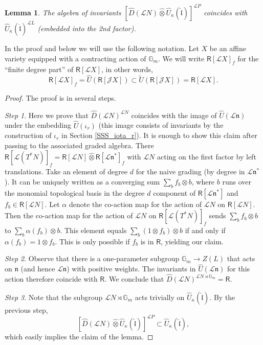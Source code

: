 \documentclass{amsart}
\newtheorem{Lem}[Thm]{Lemma}
\theoremstyle{definition}
\newcommand{\Ring}{\mathsf{R}}
\newcommand{\lf}{\mathfrak{l}}
\newcommand{\Jet}{\mathscr{J}}
\newcommand{\Loop}{\mathscr{L}}
\numberwithin{equation}{section}
\begin{document}
\begin{Lem}\label{Lem:invariant_containment}
The algebra of invariants
$[\widehat{D}(\Loop N)\widehat{\otimes}\widehat{U}_\kappa(\hat{\lf})]^{\Loop P}$ coincides with $\widehat{U}_\kappa(\hat{\lf})^{\Loop L}$ (embedded into the 2nd factor).
\end{Lem}

 In the proof and below we will use the following notation. Let $X$ be an affine variety equipped with a contracting action of $\mathbb{G}_m$. We will write $\Ring[\Loop X]_f$ for the ``finite degree part'' of $\Ring[\Loop X]$, in other words, $$\Ring[\Loop X]_f=\widehat{U}(\Ring[\Jet X])\subset \widetilde{U}(\Ring[\Jet X])=\Ring[\Loop X].$$

\begin{proof}
The proof is in several steps. 

{\it Step 1}. Here we prove that $\widehat{D}(\Loop N)^{\Loop N}$ coincides with the image of $\widehat{U}(\Loop \mathfrak{n})$ under the embedding  $\widehat{U}(\iota_r)$ (this image consists of invariants by the construction of $\iota_r$ in Section \ref{SSS_iota_r}). It is enough to show this claim 
after passing to the associated graded algebra. There 
$\Ring[\Loop(T^*N)]_f=\Ring[\Loop N]\widehat{\otimes}\Ring[\Loop \mathfrak{n}^*]_f$ with $\Loop N$ acting on the first factor by left translations. Take an element of degree $d$ for the naive grading
(by degree in $\Loop \mathfrak{n}^*$). It can be uniquely written as a converging sum $\sum_b f_b\otimes b$, where $b$ runs over the monomial topological basis in the degree $d$ component of  $\Ring[\Loop \mathfrak{n}^*]$ and $f_b\in \Ring[\Loop N]$. 
Let $\alpha$ denote the co-action map for the action of $\Loop N$ on $\Ring[\Loop N]$. Then the co-action map for the action of $\Loop N$
on $\Ring[\Loop(T^*N)]_f$ sends $\sum_b f_b\otimes b$ to 
$\sum_b \alpha(f_b)\otimes b$. This element equals
$\sum_b (1\otimes f_b)\otimes b$ if and only if $\alpha(f_b)=1\otimes f_b$. This is only possible if $f_b$ is in $\Ring$, yielding our claim. 

{\it Step 2}. Observe that there is a one-parameter subgroup
$\mathbb{G}_m\rightarrow Z(L)$ that acts on $\mathfrak{n}$
(and hence $\Loop \mathfrak{n}$) with positive weights. The invariants in $\widehat{U}(\Loop \mathfrak{n})$ for this action therefore coincide with $\Ring$. We conclude that  $\widehat{D}(\Loop N)^{\Loop N\rtimes \mathbb{G}_m}=\Ring$.

{\it Step 3}.
Note that the subgroup $\Loop N\rtimes \mathbb{G}_m$ acts trivially on 
$\widehat{U}_\kappa(\hat{\lf})$. By the previous step,  
$$[\widehat{D}(\Loop N)\widehat{\otimes}\widehat{U}_\kappa(\hat{\lf})]^{\Loop P}\subset \widehat{U}_\kappa(\hat{\lf}),$$
which easily implies the claim of the lemma.
\end{proof}
\end{document}
